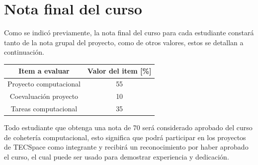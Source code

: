 ﻿\documentclass[letterpaper]{article}
\begin{document}
\section{Nota final del curso}
Como se indicó previamente, la nota final del curso para cada estudiante constará tanto de la nota
grupal del proyecto, como de otros valores, estos se detallan a continuación.
\begin{table}[h]
    \centering
    \begin{tabular}{cc}
        \toprule
            Item a evaluar & Valor del item [\%] \\
        \midrule
            Proyecto computacional & 55 \\
            Coevaluación proyecto  & 10 \\
            Tareas computacional   & 35 \\
        \bottomrule
    \end{tabular}
\end{table}

Todo estudiante que obtenga una nota de 70 será considerado aprobado del curso de cohetería
computacional, esto significa que podrá participar en los proyectos de TECSpace como integrante y
recibirá un reconocimiento por haber aprobado el curso, el cual puede ser usado para demostrar
experiencia y dedicación.
\end{document}
